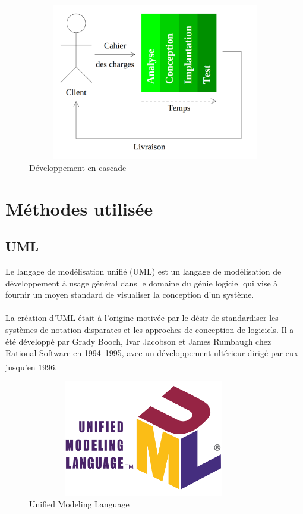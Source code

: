 \documentclass[12pt]{report}
\begin{document}
\begin{figure}[h]
\centering
    \includegraphics[width = 5in, height = 2.7in]{../Images/Analyse_Conception.png}
\caption{Développement en cascade}
\end{figure}

\newpage

\section{Méthodes utilisée}

\subsection{UML}
Le langage de modélisation unifié (UML) est un langage de modélisation de développement à usage général dans le domaine du génie logiciel qui vise à fournir un moyen standard de visualiser la conception d'un système.
\\\\
La création d'UML était à l'origine motivée par le désir de standardiser les systèmes de notation disparates et les approches de conception de logiciels. Il a été développé par Grady Booch, Ivar Jacobson et James Rumbaugh chez Rational Software en 1994–1995, avec un développement ultérieur dirigé par eux jusqu'en 1996.\textsuperscript{\cite{booch2005unified}}

\begin{figure}[h]
\centering
    \includegraphics[width = 4in, height = 2in]{../Images/UMLlogo.png}
\caption{Unified Modeling Language}
\end{figure}
\end{document}
